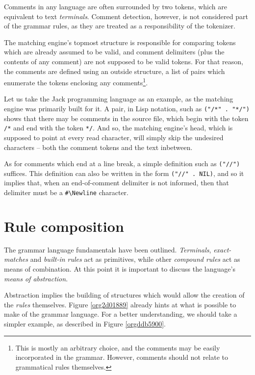 \documentclass[a4paper,11pt,oneside]{article}
\begin{document}
Comments in any language are often surrounded by two tokens, which are
equivalent to text \emph{terminals}. Comment detection, however, is not
considered part of the grammar rules, as they are treated as a
responsibility of the tokenizer.

The matching engine's topmost structure is responsible for comparing
tokens which are already assumed to be valid, and comment delimiters
(plus the contents of any comment) are not supposed to be valid
tokens. For that reason, the comments are defined using an outside
structure, a list of pairs which enumerate the tokens enclosing any
comments\footnote{This is mostly an arbitrary choice, and the comments may be
easily incorporated in the grammar. However, comments should not
relate to grammatical rules themselves.}.

Let us take the Jack programming language as an example, as the
matching engine was primarily built for it. A pair, in Lisp notation,
such as \texttt{("/*" . "*/")} shows that there may be comments in the source
file, which begin with the token \texttt{/*} and end with the token \texttt{*/}. And
so, the matching engine's head, which is supposed to point at every
read character, will simply skip the undesired characters -- both the
comment tokens and the text inbetween.

As for comments which end at a line break, a simple definition such as
\texttt{("//")} suffices. This definition can also be written in the form
\texttt{("//" . NIL)}, and so it implies that, when an end-of-comment delimiter
is not informed, then that delimiter must be a \texttt{\#\textbackslash{}Newline} character.

\section{Rule composition}
\label{sec:orgb4fb6d7}

The grammar language fundamentals have been outlined. \emph{Terminals},
\emph{exact-matches} and \emph{built-in rules} act as primitives, while other
\emph{compound rules} act as means of combination. At this point it is
important to discuss the language's \emph{means of abstraction}.

Abstraction implies the building of structures which would allow the
creation of the \emph{rules} themselves. Figure \ref{org2d01889} already hints
at what is possible to make of the grammar language. For a better
understanding, we should take a simpler example, as described in
Figure \ref{orgddb5900}.
\end{document}
